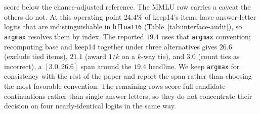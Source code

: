\begin{table}[t]
{score below the chance-adjusted reference.
The MMLU row carries a caveat the others do not. At this operating point 24.4\%
of keep14's items have answer-letter logits that are indistinguishable in
\texttt{bfloat16} (Table~\ref{tab:interface-audit}), so \texttt{argmax} resolves
them by index. The reported $19.4$ uses that \texttt{argmax} convention;
recomputing base and keep14 together under three alternatives gives $26.6$
(exclude tied items), $21.1$ (award $1/k$ on a $k$-way tie), and $3.0$ (count
ties as incorrect), a $[3.0, 26.6]$ span around the $19.4$ headline. We keep
\texttt{argmax} for consistency with the rest of the paper and report the span
rather than choosing the most favorable convention. The remaining rows score
full candidate continuations rather than single answer letters, so they do not
concentrate their decision on four nearly-identical logits in the same way.}
\label{tab:app-recovery}
\end{table}
